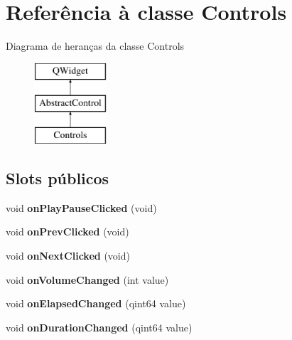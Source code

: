 \hypertarget{class_controls}{\section{Referência à classe Controls}
\label{class_controls}
}
Diagrama de heranças da classe Controls\begin{figure}[H]
\begin{center}
\leavevmode
\includegraphics[height=3.000000cm]{class_controls}
\end{center}
\end{figure}
\subsection*{Slots públicos}
\begin{DoxyCompactItemize}
\item 
\hypertarget{class_controls_ae5e221035bf36156c77c629fe4be453d}{void {\bfseries on\-Play\-Pause\-Clicked} (void)}\label{class_controls_ae5e221035bf36156c77c629fe4be453d}

\item 
\hypertarget{class_controls_a48610eb52367be6c7509457244821335}{void {\bfseries on\-Prev\-Clicked} (void)}\label{class_controls_a48610eb52367be6c7509457244821335}

\item 
\hypertarget{class_controls_a4e7c1ea477ffeb066399d48404ede8b0}{void {\bfseries on\-Next\-Clicked} (void)}\label{class_controls_a4e7c1ea477ffeb066399d48404ede8b0}

\item 
\hypertarget{class_controls_af599078654027314f33d922ce601a054}{void {\bfseries on\-Volume\-Changed} (int value)}\label{class_controls_af599078654027314f33d922ce601a054}

\item 
\hypertarget{class_controls_a09f5f92331f2531ead8a02612ae60127}{void {\bfseries on\-Elapsed\-Changed} (qint64 value)}\label{class_controls_a09f5f92331f2531ead8a02612ae60127}

\item 
\hypertarget{class_controls_a7abbbb170c237e803401311c012492ba}{void {\bfseries on\-Duration\-Changed} (qint64 value)}\label{class_controls_a7abbbb170c237e803401311c012492ba}

\end{DoxyCompactItemize}
